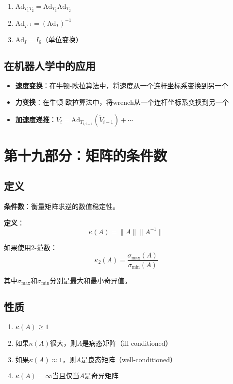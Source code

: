 \documentclass[12pt,a4paper]{article}
\begin{document}
\begin{enumerate}
\item $\text{Ad}_{T_1 T_2} = \text{Ad}_{T_1} \text{Ad}_{T_2}$
\item $\text{Ad}_{T^{-1}} = (\text{Ad}_T)^{-1}$
\item $\text{Ad}_I = I_6$（单位变换）
\end{enumerate}

\subsection{在机器人学中的应用}

\begin{itemize}
\item \textbf{速度变换}：在牛顿-欧拉算法中，将速度从一个连杆坐标系变换到另一个
\item \textbf{力变换}：在牛顿-欧拉算法中，将wrench从一个连杆坐标系变换到另一个
\item \textbf{加速度递推}：$\dot{V}_i = \text{Ad}_{T_{i,i-1}}(\dot{V}_{i-1}) + \cdots$
\end{itemize}

\section{第十九部分：矩阵的条件数}

\subsection{定义}

\textbf{条件数}：衡量矩阵求逆的数值稳定性。

\textbf{定义}：
\begin{equation}
\kappa(A) = \|A\| \|A^{-1}\|
\end{equation}

如果使用2-范数：
\begin{equation}
\kappa_2(A) = \frac{\sigma_{\max}(A)}{\sigma_{\min}(A)}
\end{equation}

其中$\sigma_{\max}$和$\sigma_{\min}$分别是最大和最小奇异值。

\subsection{性质}

\begin{enumerate}
\item $\kappa(A) \geq 1$
\item 如果$\kappa(A)$很大，则$A$是病态矩阵（ill-conditioned）
\item 如果$\kappa(A) \approx 1$，则$A$是良态矩阵（well-conditioned）
\item $\kappa(A) = \infty$当且仅当$A$是奇异矩阵
\end{enumerate}
\end{document}
